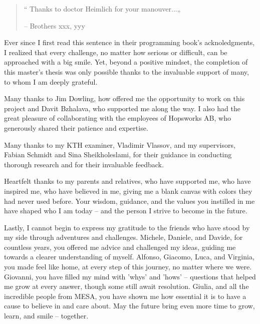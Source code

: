 
\begin{comment}
    When you write your acknowledgements, write an exhaustive list of all the people you wish to
    thank for helping or collaborating with you on your thesis; then organize them, beginning with
    those who helped you with the product (the actual writing of the dissertation itself) the most.
    You may even want to say some words about the people who helped you in finding the
    sources for your thesis: the librarian’s knowledge and patience cannot be overestimated. Do
    not overlook those (perhaps before you came to Georgia Tech) who helped you to gain
    practical experience. These people may have been paramount in their contribution to what
    you achieved at Tech. At the end, most writers thank those who lent moral/emotional
    support. Of course, they are often parents, spouses, friends, and colleagues—all of those who
    supported your effort.
\end{comment}

\begin{quote}
    “ Thanks to doctor Heimlich for your manouver...„

    -- Brothers xxx, yyy
\end{quote}
Ever since I first read this sentence in their programming book's acknoledgments, I realized that every challenge, no matter how serious or difficult, can be approached with a big smile. Yet, beyond a positive mindset, the completion of this master's thesis was only possible thanks to the invaluable support of many, to whom I am deeply grateful.

Many thanks to Jim Dowling, how offered me the opportunity to work on this project and Davit Bzhalava, who supported me along the way. I also had the great pleasure of collaborating with the employees of Hopsworks AB, who generously shared their patience and expertise.

Many thanks to my KTH examiner, Vladimir Vlassov, and my supervisors, Fabian Schmidt and Sina Sheikholeslami, for their guidance in conducting thorough research and for their invaluable feedback.

Heartfelt thanks to my parents and relatives, who have supported me, who have inspired me, who have believed in me, giving me a blank canvas with colors they had never used before. Your wisdom, guidance, and the values you instilled in me have shaped who I am today -- and the person I strive to become in the future.

Lastly, I cannot begin to express my gratitude to the friends who have stood by my side through adventures and challenges. Michele, Daniele, and Davide, for countless years, you offered me advice and challenged my ideas, guiding me towards a clearer understanding of myself. Alfonso, Giacomo, Luca, and Virginia, you made feel like home, at every step of this journey, no matter where we were. Giovanni, you have filled my mind with 'whys' and 'hows' -- questions that helped me grow at every answer, though some still await resolution. Giulia, and all the incredible people from MESA, you have shown me how essential it is to have a cause to believe in and care about. May the future bring even more time to grow, learn, and smile -- together.